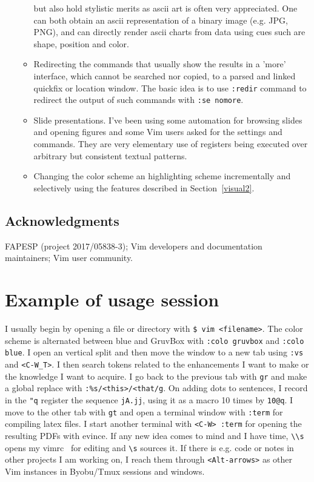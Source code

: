 \documentclass{article}
\newcommand{\ttt}[1] {
	\texttt{<#1>}}
\newcommand{\tttt}[1]{\texttt{#1}}
\begin{document}
\begin{itemize}
\begin{itemize}
        but also hold stylistic merits as ascii art is often
        very appreciated.
        One can both obtain an ascii representation of a binary image (e.g. JPG, PNG),
        and can directly render ascii charts from data using cues such are shape, position
        and color.
      \item Redirecting the commands that usually show the results in a 'more' interface,
        which cannot be searched nor copied,
        to a parsed and linked quickfix or location window.
        The basic idea is to use \tttt{:redir} command to redirect the output
        of such commands with \tttt{:se nomore}.
      \item Slide presentations. I've been using some automation for browsing
        slides and opening figures and some Vim users asked for the settings and
        commands. They are very elementary use of registers being executed over
        arbitrary but consistent textual patterns.
      \item Changing the color scheme an highlighting scheme incrementally
        and selectively using the features described in Section~\ref{visual2}.
    \end{itemize}
\end{itemize}

\subsection*{Acknowledgments}
FAPESP (project 2017/05838-3); Vim developers and documentation maintainers;
Vim user community. 

\appendix
\section{Example of usage session}
I usually begin by opening a file or directory
with \tttt{\$ vim <filename>}.
The color scheme is alternated between
blue and GruvBox with
\tttt{:colo gruvbox} and \tttt{:colo blue}.
I open an vertical split and then move
the window to a new tab using
\tttt{:vs} and \ttt{C-W\_T}.
I then search tokens related to
the enhancements I want to make or
the knowledge I want to acquire.
I go back to the previous tab with \tttt{gr}
and make a global replace with
\tttt{:\%s/<this>/<that/g}.
On adding dots to sentences,
I record in the \tttt{"q} register
the sequence \tttt{jA.jj},
using it as a macro 10 times by
\tttt{10@q}.
I move to the other tab with \tttt{gt}
and open a terminal window with \tttt{:term}
for compiling latex files.
I start another terminal with \tttt{<C-W> :term}
for opening the resulting PDFs with evince.
If any new idea comes to mind and I have time,
\tttt{\textbackslash\textbackslash s} opens 
my vimrc~\cite{vimrc} for editing and \tttt{\textbackslash s}
sources it.
If there is e.g. code or notes in other projects I am working
on, I reach them through \tttt{<Alt-arrows>} as other Vim instances
in Byobu/Tmux sessions and windows.
\end{document}
